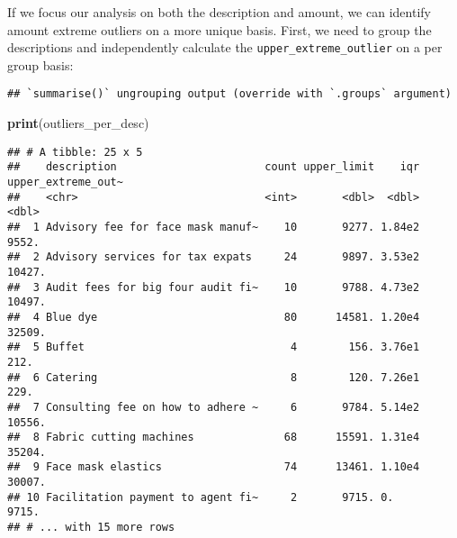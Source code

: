 \documentclass[
]{book}
\newenvironment{Shaded}{\begin{snugshade}}{\end{snugshade}}
\newcommand{\DataTypeTok}[1]{\textcolor[rgb]{0.13,0.29,0.53}{#1}}
\newcommand{\DecValTok}[1]{\textcolor[rgb]{0.00,0.00,0.81}{#1}}
\newcommand{\FloatTok}[1]{\textcolor[rgb]{0.00,0.00,0.81}{#1}}
\newcommand{\KeywordTok}[1]{\textcolor[rgb]{0.13,0.29,0.53}{\textbf{#1}}}
\newcommand{\NormalTok}[1]{#1}
\newcommand{\OperatorTok}[1]{\textcolor[rgb]{0.81,0.36,0.00}{\textbf{#1}}}
\newcommand{\StringTok}[1]{\textcolor[rgb]{0.31,0.60,0.02}{#1}}
\begin{document}
If we focus our analysis on both the description and amount, we can identify amount extreme outliers on a more unique basis. First, we need to group the descriptions and independently calculate the \texttt{upper\_extreme\_outlier} on a per group basis:

\begin{Shaded}
\end{Shaded}

\begin{verbatim}
## `summarise()` ungrouping output (override with `.groups` argument)
\end{verbatim}

\begin{Shaded}
\begin{Highlighting}[]
\KeywordTok{print}\NormalTok{(outliers_per_desc)}
\end{Highlighting}
\end{Shaded}

\begin{verbatim}
## # A tibble: 25 x 5
##    description                       count upper_limit    iqr upper_extreme_out~
##    <chr>                             <int>       <dbl>  <dbl>              <dbl>
##  1 Advisory fee for face mask manuf~    10       9277. 1.84e2              9552.
##  2 Advisory services for tax expats     24       9897. 3.53e2             10427.
##  3 Audit fees for big four audit fi~    10       9788. 4.73e2             10497.
##  4 Blue dye                             80      14581. 1.20e4             32509.
##  5 Buffet                                4        156. 3.76e1               212.
##  6 Catering                              8        120. 7.26e1               229.
##  7 Consulting fee on how to adhere ~     6       9784. 5.14e2             10556.
##  8 Fabric cutting machines              68      15591. 1.31e4             35204.
##  9 Face mask elastics                   74      13461. 1.10e4             30007.
## 10 Facilitation payment to agent fi~     2       9715. 0.                  9715.
## # ... with 15 more rows
\end{verbatim}
\end{document}
